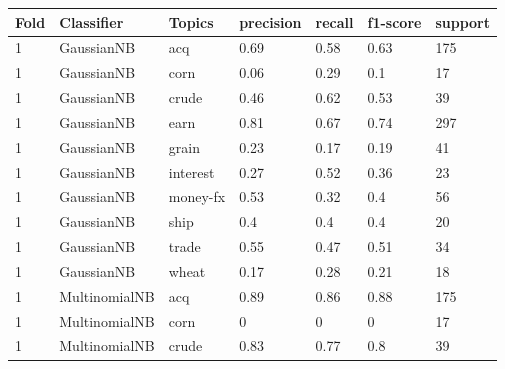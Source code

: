 \documentclass{article}
\begin{document}
\begin{table}[h]
\begin{tabular}{lllllll}
\textbf{Fold} & \textbf{Classifier}    & \textbf{Topics} & \textbf{precision} & \textbf{recall} & \textbf{f1-score} & \textbf{support} \\ \hline
1             & GaussianNB             & acq             & 0.69               & 0.58            & 0.63              & 175              \\
1             & GaussianNB             & corn            & 0.06               & 0.29            & 0.1               & 17               \\
1             & GaussianNB             & crude           & 0.46               & 0.62            & 0.53              & 39               \\
1             & GaussianNB             & earn            & 0.81               & 0.67            & 0.74              & 297              \\
1             & GaussianNB             & grain           & 0.23               & 0.17            & 0.19              & 41               \\
1             & GaussianNB             & interest        & 0.27               & 0.52            & 0.36              & 23               \\
1             & GaussianNB             & money-fx        & 0.53               & 0.32            & 0.4               & 56               \\
1             & GaussianNB             & ship            & 0.4                & 0.4             & 0.4               & 20               \\
1             & GaussianNB             & trade           & 0.55               & 0.47            & 0.51              & 34               \\
1             & GaussianNB             & wheat           & 0.17               & 0.28            & 0.21              & 18               \\
1             & MultinomialNB          & acq             & 0.89               & 0.86            & 0.88              & 175              \\
1             & MultinomialNB          & corn            & 0                  & 0               & 0                 & 17               \\
1             & MultinomialNB          & crude           & 0.83               & 0.77            & 0.8               & 39               \\

\end{tabular}
\end{table}
\end{document}
